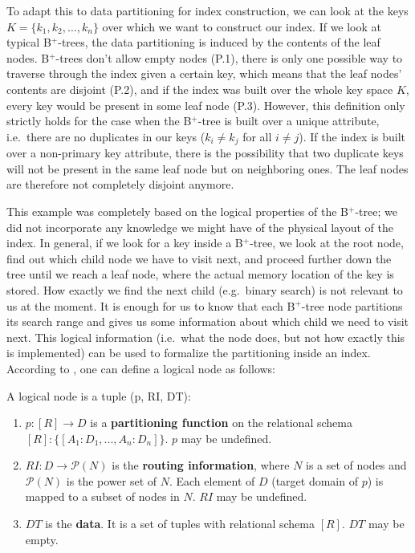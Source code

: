 \vspace{0.5cm}
To adapt this to data partitioning for index construction, we can look at the keys $K = \{k_1, k_2, ..., k_n\}$ over which we want to construct our index. If we look at typical B$^+$-trees, the data partitioning is induced by the contents of the leaf nodes. B$^+$-trees don't allow empty nodes (P.1), there is only one possible way to traverse through the index given a certain key, which means that the leaf nodes' contents are disjoint (P.2), and if the index was built over the whole key space $K$, every key would be present in some leaf node (P.3). However, this definition only strictly holds for the case when the B$^+$-tree is built over a unique attribute, i.e.~there are no duplicates in our keys ($k_i \neq k_j$ for all $i \neq j$). If the index is built over a non-primary key attribute, there is the possibility that two duplicate keys will not be present in the same leaf node but on neighboring ones. The leaf nodes are therefore not completely disjoint anymore.  

This example was completely based on the logical properties of the B$^+$-tree; we did not incorporate any knowledge we might have of the physical layout of the index. In general, if we look for a key inside a B$^+$-tree, we look at the root node, find out which child node we have to visit next, and proceed further down the tree until we reach a leaf node, where the actual memory location of the key is stored. How exactly we find the next child (e.g.~binary search) is not relevant to us at the moment. It is enough for us to know that each B$^+$-tree node partitions its search range and gives us some information about which child we need to visit next. This logical information (i.e.~what the node does, but not how exactly this is implemented) can be used to formalize the partitioning inside an index. According to \citeauthor{Dittrich2021} \cite{Dittrich2021}, one can define a logical node as follows:

\vspace{0.5cm}
\begin{definition}\label{def:logicalnode}
A logical node is a tuple (p, RI, DT):
\begin{enumerate}
    \item $p: [R] \rightarrow D$ is a \textbf{partitioning function} on the relational schema $[R] : \{ [A_1 : D_1, ..., A_n : D_n] \}$. $p$ may be undefined.
    \item $RI : D \rightarrow \mathcal{P}(N)$ is the \textbf{routing information}, where $N$ is a set of nodes and $\mathcal{P}(N)$ is the power set of $N$. Each element of $D$ (target domain of $p$) is mapped to a subset of nodes in $N$. $RI$ may be undefined.
    \item $DT$ is the \textbf{data}. It is a set of tuples with relational schema $[R]$. $DT$ may be empty.
\end{enumerate}
\end{definition}


